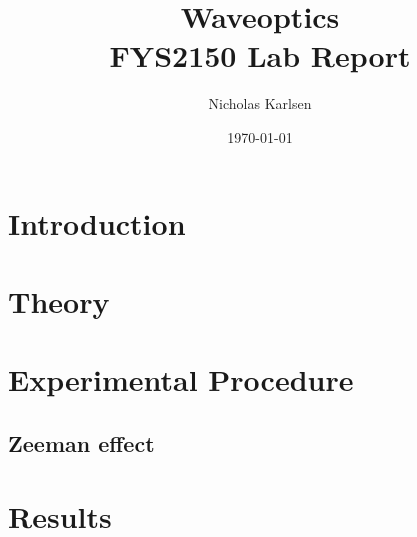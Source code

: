 \documentclass[11pt,a4paper]{article}
\begin{document}

\title{Waveoptics\\
\normalsize{FYS2150 Lab Report}}

\author{Nicholas Karlsen}

\date{\today}%

\maketitle

\begin{abstract}
\end{abstract}


\section{\label{sect:intro}Introduction}

\section{\label{sect:theory}Theory}
\section{\label{section:experimental}Experimental Procedure} 
  \subsection{Zeeman effect}
\section{\label{sect:results}Results}
\end{document}
